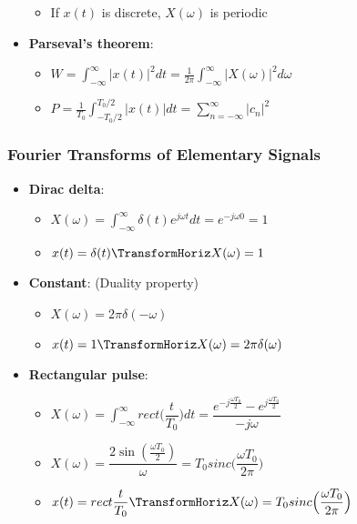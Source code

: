\begin{multicols}{2}
\begin{itemize}
\begin{itemize}
        \item If $x(t)$ is discrete, $X(\omega)$ is periodic
    \end{itemize}
    \item \textbf{Parseval's theorem}: 
    \begin{itemize}
        \item $W=\int_{-\infty}^{\infty} |x(t)|^2 dt = \frac{1}{2\pi} \int_{-\infty}^{\infty} |X(\omega)|^2d\omega$ \newline
        \item $P=\frac{1}{T_0}\int_{-T_0/2}^{T_0/2} |x(t)|dt = \sum_{n=-\infty}^{\infty} |c_n|^2$
    \end{itemize}
\end{itemize}

\subsubsection{Fourier Transforms of Elementary Signals}
\begin{itemize}
    \item \textbf{Dirac delta}:  
    \begin{itemize}
        \item $X(\omega) = \int_{-\infty}^{\infty} \delta(t)e^{j\omega t} dt = e^{-j\omega0} = 1$
        \item $x(t)=\delta(t) \TransformHoriz X(\omega)=1$
    \end{itemize}
    \item \textbf{Constant}: (Duality property)
    \begin{itemize}
        \item $X(\omega) = 2\pi\delta(-\omega)$
        \item $x(t)=1 \TransformHoriz X(\omega)=2\pi\delta(\omega)$
    \end{itemize}
    \item \textbf{Rectangular pulse}:
    \begin{itemize}
        \item $X(\omega) = \int_{-\infty}^{\infty} rect\Big( \dfrac{t}{T_0} \Big) dt = \dfrac{e^{-j\frac{\omega T_0}{2}}-e^{j\frac{\omega T_0}{2}}}{-j\omega}$
        \item $X(\omega) = \dfrac{2\sin(\frac{\omega T_0}{2})}{\omega} = T_0 sinc\Big( \dfrac{\omega T_0}{2\pi} \Big)$
        \item $x(t)=rect\dfrac{t}{T_0} \TransformHoriz X(\omega) = T_0 sinc\Big( \dfrac{\omega T_0}{2\pi} \Big)$
    \end{itemize}

\end{itemize}
\end{multicols}
